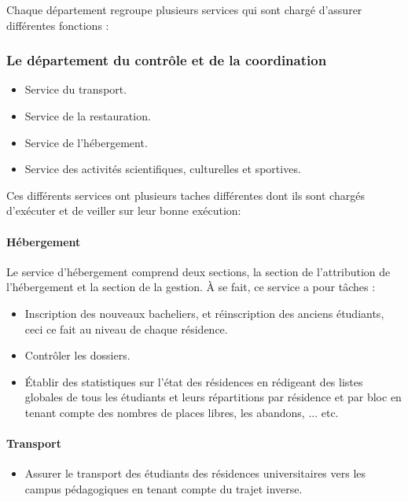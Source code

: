 Chaque département regroupe plusieurs services qui sont chargé d'assurer différentes fonctions :

\subsubsection{Le département du contrôle et de la coordination}
\begin{itemize}
    \item Service du transport.
    \item Service de la restauration.
    \item Service de l'hébergement.
    \item Service des activités scientifiques, culturelles et sportives.\\
\end{itemize}

Ces différents services ont plusieurs taches différentes dont ils sont chargés d'exécuter et de veiller sur leur bonne exécution:

\paragraph{Hébergement}
Le service d'hébergement comprend deux sections, la section de l'attribution de l'hébergement et la section de la gestion. À se fait, ce service a pour tâches :

\begin{itemize}
    \item Inscription des nouveaux bacheliers, et réinscription des anciens étudiants, ceci ce fait au niveau de chaque résidence.
    \item Contrôler les dossiers.
    \item Établir des statistiques sur l'état des résidences en rédigeant des listes globales de tous les étudiants et leurs répartitions par résidence et par bloc en tenant compte des nombres de places libres, les abandons, ... etc.
\end{itemize}

\paragraph{Transport}
\begin{itemize}
    \item Assurer le transport des étudiants des résidences universitaires vers les campus pédagogiques en tenant compte du trajet inverse.
\end{itemize}

